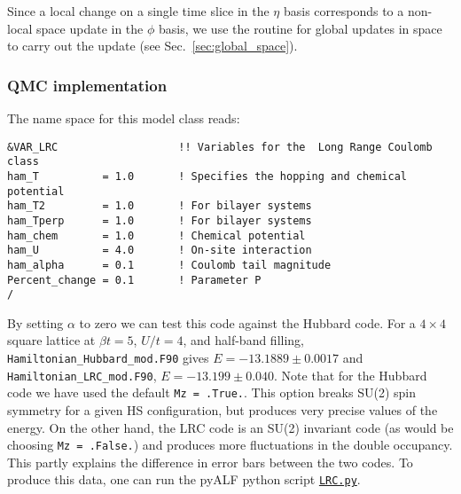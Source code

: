 Since a local change on  a single time slice in the $\eta$ basis corresponds to a non-local space update  in the $\phi$ basis, we  use the routine for global updates in space to carry out the update (see Sec.~\ref{sec:global_space}). 

\subsubsection*{ QMC implementation } 

The name space for this model class  reads: 

\begin{lstlisting}[style=fortran,escapechar=\#,breaklines=true]
&VAR_LRC                   !! Variables for the  Long Range Coulomb class
ham_T          = 1.0       ! Specifies the hopping and chemical potential
ham_T2         = 1.0       ! For bilayer systems
ham_Tperp      = 1.0       ! For bilayer systems
ham_chem       = 1.0       ! Chemical potential
ham_U          = 4.0       ! On-site interaction
ham_alpha      = 0.1       ! Coulomb tail magnitude
Percent_change = 0.1       ! Parameter P 
/
\end{lstlisting}

By setting $\alpha$ to zero we can test this code against the Hubbard code.   For a   $ 4 \times 4 $ square  lattice at $ \beta t = 5$, $U/t = 4$, and half-band filling,     \texttt{Hamiltonian\_Hubbard\_mod.F90}  gives $ E = -13.1889 \pm  0.0017 $  and \texttt{Hamiltonian\_LRC\_mod.F90}, $E = -13.199 \pm  0.040 $.    Note that for the  Hubbard code we have used  the default \texttt{Mz = .True.}.   This  option   breaks SU(2) spin symmetry for a given HS configuration, but produces very precise values of the energy. On the other hand,  the LRC code  is an SU(2) invariant code (as would be  choosing \texttt{Mz = .False.})  and  produces  more  fluctuations in the double occupancy.   This  partly explains the difference in  error  bars between the two codes.    To produce this data, one  can run the pyALF  python script \href{https://git.physik.uni-wuerzburg.de/ALF/pyALF/-/blob/master/Scripts/LRC.py}{\texttt{LRC.py}}.
  



